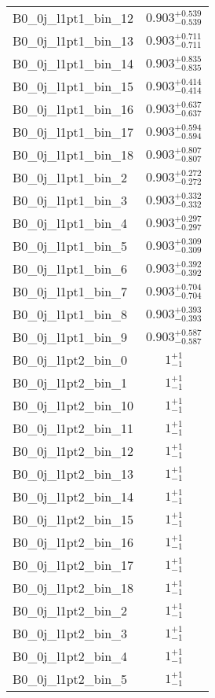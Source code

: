 \begin{tabular}{|l|c|}
B0\_0j\_l1pt1\_bin\_12 & $0.903^{+0.539}_{-0.539}$ \\
B0\_0j\_l1pt1\_bin\_13 & $0.903^{+0.711}_{-0.711}$ \\
B0\_0j\_l1pt1\_bin\_14 & $0.903^{+0.835}_{-0.835}$ \\
B0\_0j\_l1pt1\_bin\_15 & $0.903^{+0.414}_{-0.414}$ \\
B0\_0j\_l1pt1\_bin\_16 & $0.903^{+0.637}_{-0.637}$ \\
B0\_0j\_l1pt1\_bin\_17 & $0.903^{+0.594}_{-0.594}$ \\
B0\_0j\_l1pt1\_bin\_18 & $0.903^{+0.807}_{-0.807}$ \\
B0\_0j\_l1pt1\_bin\_2 & $0.903^{+0.272}_{-0.272}$ \\
B0\_0j\_l1pt1\_bin\_3 & $0.903^{+0.332}_{-0.332}$ \\
B0\_0j\_l1pt1\_bin\_4 & $0.903^{+0.297}_{-0.297}$ \\
B0\_0j\_l1pt1\_bin\_5 & $0.903^{+0.309}_{-0.309}$ \\
B0\_0j\_l1pt1\_bin\_6 & $0.903^{+0.392}_{-0.392}$ \\
B0\_0j\_l1pt1\_bin\_7 & $0.903^{+0.704}_{-0.704}$ \\
B0\_0j\_l1pt1\_bin\_8 & $0.903^{+0.393}_{-0.393}$ \\
B0\_0j\_l1pt1\_bin\_9 & $0.903^{+0.587}_{-0.587}$ \\
B0\_0j\_l1pt2\_bin\_0 & $1^{+1}_{-1}$ \\
B0\_0j\_l1pt2\_bin\_1 & $1^{+1}_{-1}$ \\
B0\_0j\_l1pt2\_bin\_10 & $1^{+1}_{-1}$ \\
B0\_0j\_l1pt2\_bin\_11 & $1^{+1}_{-1}$ \\
B0\_0j\_l1pt2\_bin\_12 & $1^{+1}_{-1}$ \\
B0\_0j\_l1pt2\_bin\_13 & $1^{+1}_{-1}$ \\
B0\_0j\_l1pt2\_bin\_14 & $1^{+1}_{-1}$ \\
B0\_0j\_l1pt2\_bin\_15 & $1^{+1}_{-1}$ \\
B0\_0j\_l1pt2\_bin\_16 & $1^{+1}_{-1}$ \\
B0\_0j\_l1pt2\_bin\_17 & $1^{+1}_{-1}$ \\
B0\_0j\_l1pt2\_bin\_18 & $1^{+1}_{-1}$ \\
B0\_0j\_l1pt2\_bin\_2 & $1^{+1}_{-1}$ \\
B0\_0j\_l1pt2\_bin\_3 & $1^{+1}_{-1}$ \\
B0\_0j\_l1pt2\_bin\_4 & $1^{+1}_{-1}$ \\
B0\_0j\_l1pt2\_bin\_5 & $1^{+1}_{-1}$ \\

\end{tabular}
